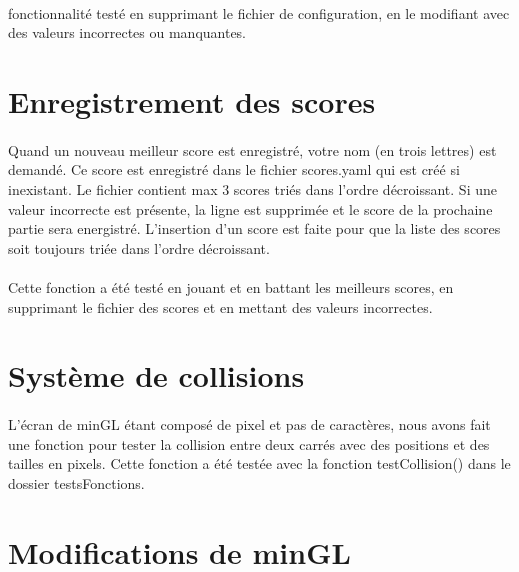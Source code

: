 \documentclass{article}
\begin{document}
\paragraph{} fonctionnalité testé en supprimant le fichier de configuration, en le modifiant avec des valeurs incorrectes ou manquantes. 
\section{Enregistrement des scores}
\paragraph{} Quand un nouveau meilleur score est enregistré, votre nom (en trois lettres) est demandé. Ce score est enregistré dans le fichier scores.yaml qui est créé si inexistant. Le fichier contient max 3 scores triés dans l'ordre décroissant. Si une valeur incorrecte est présente, la ligne est supprimée et le score de la prochaine partie sera energistré. L'insertion d'un score est faite pour que la liste des scores soit toujours triée dans l'ordre décroissant.
\paragraph{} Cette fonction a été testé en jouant et en battant les meilleurs scores, en supprimant le fichier des scores et en mettant des valeurs incorrectes.
\section{Système de collisions}
\paragraph{}L'écran de minGL étant composé de pixel et pas de caractères, nous avons fait une fonction pour tester la collision entre deux carrés avec des positions et des tailles en pixels. Cette fonction a été testée avec la fonction testCollision() dans le dossier testsFonctions.
\section{Modifications de minGL}
\end{document}
